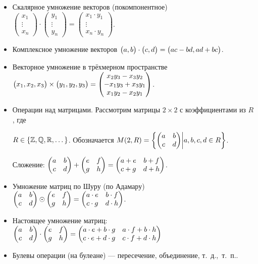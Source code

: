 \documentclass[a4paper]{report}
\begin{document}
\begin{itemize}
        \item Скалярное умножение векторов (покомпонентное)  $\begin{pmatrix}
                                                                  x_1\\ \vdots \\ x_n
        \end{pmatrix} \cdot \begin{pmatrix}
                                y_1\\ \vdots \\ y_n
        \end{pmatrix} = \begin{pmatrix}
                            x_1 \cdot y_1\\ \vdots \\ x_n \cdot y_n
        \end{pmatrix}$.

        \item Комплексное умножение векторов $\begin{pmatrix}a, b\end{pmatrix} \cdot \begin{pmatrix}c, d\end{pmatrix} = \begin{pmatrix}ac - bd, ad + bc\end{pmatrix}$.

        \item Векторное умножение в трёхмерном пространстве $\begin{pmatrix}x_1, x_2, x_3\end{pmatrix} \times \begin{pmatrix}y_1, y_2, y_3\end{pmatrix} =  \begin{pmatrix}x_2 y_3 - x_3 y_2\\-x_1 y_3+x_3 y_1\\x_1 y_2-x_2 y_1\end{pmatrix}$.

        \item Операции над матрицами.
        Рассмотрим матрицы $2 \times 2$ с коэффициентами из $R$, где

        $R \in \{\mathbb{Z}, \mathbb{Q}, \mathbb{R}, \dots \}$.
        Обозначается $M(2, R) = \left\{\begin{pmatrix}a &b\\c & d\end{pmatrix}\middle|a, b, c, d \in R\right\}$.

        Сложение: $\begin{pmatrix}a&b\\c&d\end{pmatrix}+\begin{pmatrix}e&f\\g&h\end{pmatrix}=\begin{pmatrix}a+e&b+f\\c+g&d+h\end{pmatrix}$.

        \item Умножение матриц по Шуру (по Адамару) $\begin{pmatrix}a&b\\c&d\end{pmatrix} \odot \begin{pmatrix}e&f\\g&h\end{pmatrix}=\begin{pmatrix}a\cdot e&b\cdot f\\c\cdot g&d\cdot h\end{pmatrix}$.
        \item Настоящее умножение матриц: $\begin{pmatrix}a&b\\c&d\end{pmatrix}\cdot\begin{pmatrix}e&f\\g&h\end{pmatrix}=\begin{pmatrix}a\cdot e + b \cdot g&a\cdot f + b \cdot h\\c\cdot e + d \cdot g&c \cdot f + d \cdot h\end{pmatrix}$

        \item Булевы операции (на булеане) --- пересечение, объединение, т.\ д.,\ т.\ п..
    \end{itemize}
\end{document}
